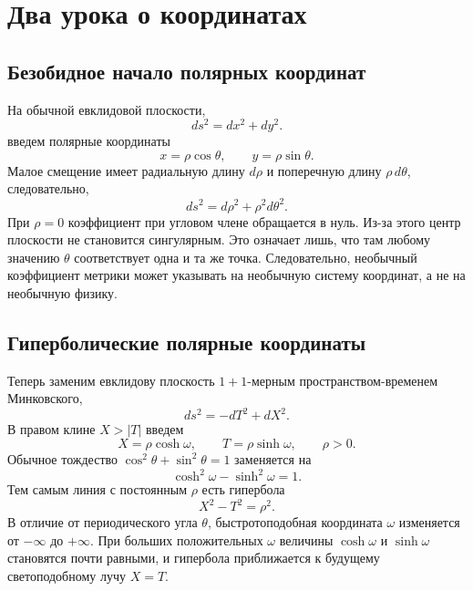 \section{Два урока о координатах}

\subsection{Безобидное начало полярных координат}

На обычной евклидовой плоскости,
\begin{equation}
ds^2=dx^2+dy^2.
\end{equation}
введем полярные координаты
\begin{equation}
x=\rho\cos\theta,
\qquad
y=\rho\sin\theta .
\end{equation}
Малое смещение имеет радиальную длину \(d\rho\) и поперечную длину \(\rho\,d\theta\), следовательно,
\begin{equation}
ds^2=d\rho^2+\rho^2d\theta^2.
\label{eq:l03-polar}
\end{equation}
При \(\rho=0\) коэффициент при угловом члене обращается в нуль. Из-за этого центр плоскости не становится сингулярным. Это означает лишь, что там любому значению \(\theta\) соответствует одна и та же точка. Следовательно, необычный коэффициент метрики может указывать на необычную систему координат, а не на необычную физику.

\subsection{Гиперболические полярные координаты}

Теперь заменим евклидову плоскость \(1+1\)-мерным пространством-временем Минковского,
\begin{equation}
ds^2=-dT^2+dX^2.
\end{equation}
В правом клине \(X>|T|\) введем
\begin{equation}
X=\rho\cosh\omega,
\qquad
T=\rho\sinh\omega,
\qquad \rho>0 .
\label{eq:l03-rindler-transform}
\end{equation}
Обычное тождество \(\cos^2\theta+\sin^2\theta=1\) заменяется на
\begin{equation}
\cosh^2\omega-\sinh^2\omega=1.
\end{equation}
Тем самым линия с постоянным \(\rho\) есть гипербола
\begin{equation}
X^2-T^2=\rho^2.
\end{equation}
В отличие от периодического угла \(\theta\), быстротоподобная координата \(\omega\) изменяется от \(-\infty\) до \(+\infty\). При больших положительных \(\omega\) величины \(\cosh\omega\) и \(\sinh\omega\) становятся почти равными, и гипербола приближается к будущему светоподобному лучу \(X=T\).

